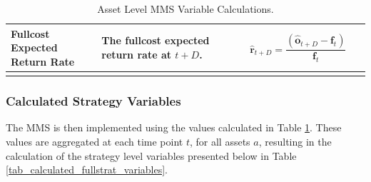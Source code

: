 \documentclass[a4paper,11pt,oneside]{article}
\theoremstyle{plain}
\theoremstyle{definition}
\begin{document}
\begin{longtable}{|p{0.25\linewidth}|p{0.375\linewidth}|p{0.375\linewidth}|}
		
		{Fullcost Expected Return Rate}
		&{The fullcost expected return rate at $t+D$.}
		&{\begin{equation}
			\mathbf{\hat{r}}_{t + D} = \frac{\left( \mathbf{\hat{o}}_{t+D} - \mathbf{f}_t \right) }
			{\mathbf{f}_t} 
			\end{equation}
		}\\\hline				
		
		\caption{Asset Level MMS Variable Calculations.}
		\label{tab_calculated_strat_variables}
	\end{longtable}

	\hfill\break
	
	\newpage
	\subsubsection{Calculated Strategy Variables} 
	
	
	The MMS  is then implemented using the values calculated in Table \ref{tab_calculated_strat_variables}. These values are aggregated at each time point $t$, for all assets $a$, resulting in the calculation of the strategy level variables presented below in Table \ref{tab_calculated_fullstrat_variables}.
	
\end{document}

